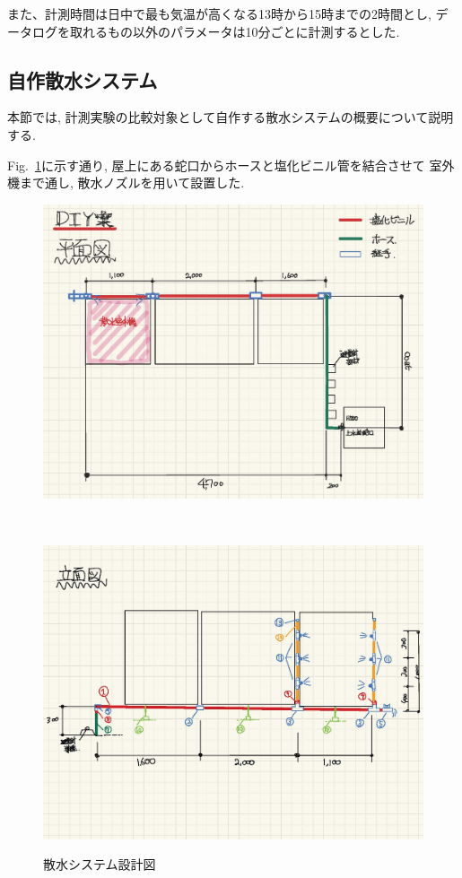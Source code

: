 \documentclass[a4j,fleqn,dvipdfmx,uplatex]{jsarticle}
\newcommand{\figref}[1]{Fig.\ \ref{#1}}
\begin{document}
また、計測時間は日中で最も気温が高くなる13時から15時までの2時間とし, 
データログを取れるもの以外のパラメータは10分ごとに計測するとした. 


\subsection{自作散水システム}
本節では, 計測実験の比較対象として自作する散水システムの概要について説明する. 

\figref{fig2:watering_sys}に示す通り, 屋上にある蛇口からホースと塩化ビニル管を結合させて
室外機まで通し, 散水ノズルを用いて設置した. 

\begin{figure}[htb]
  \centering
    \begin{minipage}[b]{\linewidth}
      \centering
      \includegraphics[width=0.8\linewidth]{img/plan_view.jpg}
      \label{subfig:plan_view}
    \end{minipage}\\
    \begin{minipage}[b]{\linewidth}
      \centering
      \includegraphics[width=0.8\linewidth]{img/back_elevation.jpg}
      \label{subfig:back_elevation}
    \end{minipage}
  \caption{散水システム設計図}
  \label{fig2:watering_sys}
\end{figure}
\end{document}
